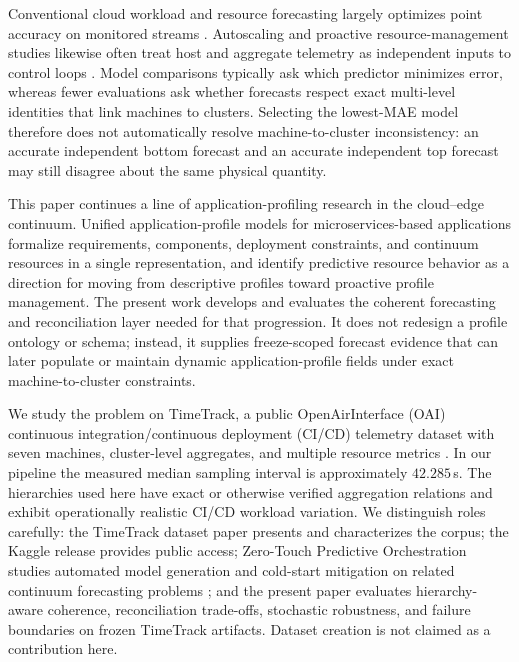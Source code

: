 \documentclass[a4paper,fleqn]{cas-dc}
\begin{document}
Conventional cloud workload and resource forecasting largely optimizes point
accuracy on monitored streams
\cite{calheiros2015workload,masdari2020workload,khan2022workload}.
Autoscaling and proactive resource-management studies likewise often treat host
and aggregate telemetry as independent inputs to control loops
\cite{toka2021kubernetes,casalicchio2019container}.
Model comparisons typically ask which predictor minimizes error, whereas fewer
evaluations ask whether forecasts respect exact multi-level identities that
link machines to clusters.
Selecting the lowest-{MAE} model therefore does not automatically resolve
machine-to-cluster inconsistency: an accurate independent bottom forecast and
an accurate independent top forecast may still disagree about the same physical
quantity.

This paper continues a line of application-profiling research in the
cloud--edge continuum.
Unified application-profile models for microservices-based applications
formalize requirements, components, deployment constraints, and continuum
resources in a single representation, and identify predictive resource
behavior as a direction for moving from descriptive profiles toward
proactive profile management.
The present work develops and evaluates the coherent forecasting and
reconciliation layer needed for that progression.
It does not redesign a profile ontology or schema; instead, it supplies
freeze-scoped forecast evidence that can later populate or maintain dynamic
application-profile fields under exact machine-to-cluster constraints.

We study the problem on TimeTrack, a public OpenAirInterface ({OAI}) continuous
integration/continuous deployment ({CI}/{CD}) telemetry dataset with seven
machines, cluster-level aggregates, and multiple resource metrics
\cite{meliani2025timetrack,meliani2025timetrackkaggle}.
In our pipeline the measured median sampling interval is approximately
$42.285$\,s.
The hierarchies used here have exact or otherwise verified aggregation
relations and exhibit operationally realistic {CI}/{CD} workload variation.
We distinguish roles carefully: the TimeTrack dataset paper presents and
characterizes the corpus; the Kaggle release provides public access; Zero-Touch
Predictive Orchestration studies automated model generation and cold-start
mitigation on related continuum forecasting problems
\cite{meliani2026zerotouch};
and the present paper evaluates hierarchy-aware coherence, reconciliation
trade-offs, stochastic robustness, and failure boundaries on frozen TimeTrack
artifacts.
Dataset creation is not claimed as a contribution here.
\end{document}
